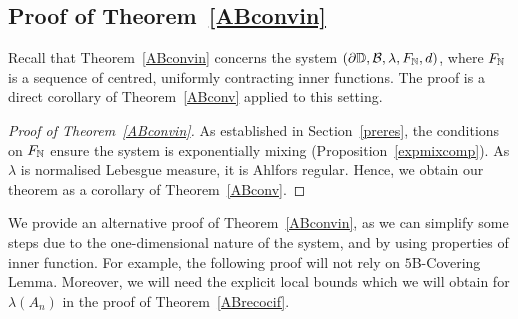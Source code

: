 \documentclass[11pt,reqno]{amsart}
\newcommand{\N}{{\Bbb N}}
\newcommand{\D}{{\Bbb D}}
\newcommand{\0}{\mathbf{0}}
\theoremstyle{remark}
\numberwithin{equation}{section}
\theoremstyle{remark}
\numberwithin{equation}{section}
\begin{document}
\subsection{Proof of Theorem~\ref{ABconvin}}
Recall that Theorem~\ref{ABconvin} concerns the system $(\partial \D, \mathcal{B},\lambda , F_\N, d)$, where $F_\N$ is a sequence of centred, uniformly contracting inner functions. 
The proof is a direct corollary of Theorem~\ref{ABconv} applied to this setting.
 \begin{proof}[Proof of Theorem~\ref{ABconvin}]
As established in Section~\ref{preres}, the conditions on $F_\N$ ensure the system is exponentially mixing (Proposition~\ref{expmixcomp}). As $\lambda$ is normalised Lebesgue measure, it is Ahlfors regular. Hence, we obtain our theorem as a corollary of Theorem~\ref{ABconv}.
  \end{proof}
 We provide an alternative proof of Theorem~\ref{ABconvin}, as we can simplify some steps due to the one-dimensional nature of the  system, and by using properties of inner function. For example, the following proof will not rely on $5$B-Covering Lemma. Moreover, we will need the explicit local bounds which we will obtain for $\lambda(A_n)$ in the proof of Theorem~\ref{ABrecocif}.
\end{document}
